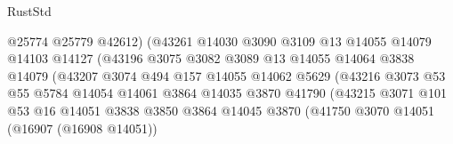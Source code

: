 \begin{lexlean}{RustStd}
\begin{coremodule}
                                      @25774
                                      @25779
                                      @42612)
                                    (@43261
                                      @14030
                                      @3090
                                      @3109
                                      @13
                                      @14055
                                      @14079
                                      @14103
                                      @14127
                                      (@43196
                                        @3075
                                        @3082
                                        @3089
                                        @13
                                        @14055
                                        @14064
                                        @3838
                                        @14079
                                        (@43207
                                          @3074
                                          @494
                                          @157
                                          @14055
                                          @14062
                                          @5629
                                          (@43216
                                            @3073
                                            @53
                                            @55
                                            @5784
                                            @14054
                                            @14061
                                            @3864
                                            @14035
                                            @3870
                                            @41790
                                            (@43215
                                              @3071
                                              @101
                                              @53
                                              @16
                                              @14051
                                              @3838
                                              @3850
                                              @3864
                                              @14045
                                              @3870
                                              (@41750
                                                @3070
                                                @14051
                                                (@16907 (@16908 @14051))

\end{coremodule}
\end{lexlean}
